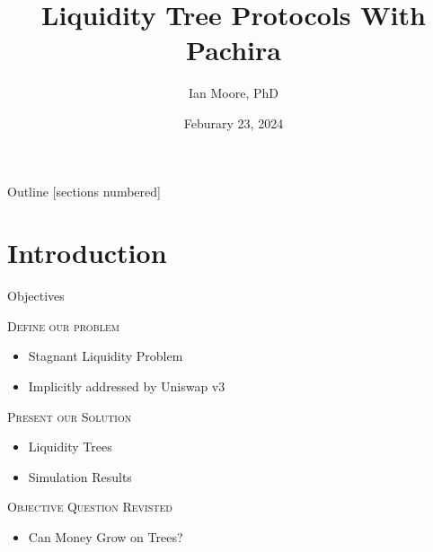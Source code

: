 \documentclass[10pt,xcolor=svgnames]{beamer} %
\title{Liquidity Tree Protocols With Pachira}
\author[Name]{Ian Moore, PhD \inst{$\dagger$}}%
\institute[shortinst]{\inst{$\dagger$} Researcher @ Syslabs (email: imoore@syscoin.org) }
\date{Feburary 23, 2024} %
\begin{document}
{
\maketitle
}%


\begin{frame}{Outline}
  [sections numbered] %
  \tableofcontents[hideallsubsections] %
\end{frame}

\section{Introduction}



\begin{frame}{Objectives}

\begin{exampleblock}{\textsc{Define our problem}}
\begin{itemize}
  \item Stagnant Liquidity Problem
  \item Implicitly addressed by Uniswap v3
\end{itemize}  
\end{exampleblock}

\begin{exampleblock}{\textsc{Present our Solution}}
\begin{itemize}
  \item Liquidity Trees
  \item Simulation Results
\end{itemize}
\end{exampleblock}

\begin{exampleblock}{\textsc{Objective Question Revisted}}
\begin{itemize}
  \item Can Money Grow on Trees?
\end{itemize}
\end{exampleblock}

\end{frame}
\end{document}
